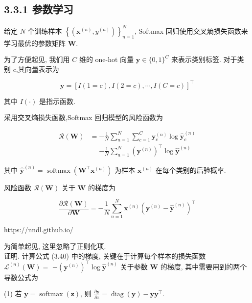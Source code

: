 \documentclass[10pt]{article}
\begin{document}
\subsection*{3.3.1 参数学习}
给定 $N$ 个训练样本 $\left\{\left(\boldsymbol{x}^{(n)}, y^{(n)}\right)\right\}_{n=1}^{N}$, Softmax 回归使用交叉熵损失函数来学习最优的参数矩阵 $\boldsymbol{W}$.

为了方便起见, 我们用 $C$ 维的 one-hot 向量 $\boldsymbol{y} \in\{0,1\}^{C}$ 来表示类别标签. 对于类别 $c$,其向量表示为


\begin{equation*}
\boldsymbol{y}=[I(1=c), I(2=c), \cdots, I(C=c)]^{\top} \tag{3.37}
\end{equation*}


其中 $I(\cdot)$ 是指示函数.

采用交叉熵损失函数,Softmax 回归模型的风险函数为


\begin{align*}
\mathcal{R}(\boldsymbol{W}) & =-\frac{1}{N} \sum_{n=1}^{N} \sum_{c=1}^{C} \boldsymbol{y}_{c}^{(n)} \log \hat{\boldsymbol{y}}_{c}^{(n)}  \tag{3.38}\\
& =-\frac{1}{N} \sum_{n=1}^{N}\left(\boldsymbol{y}^{(n)}\right)^{\top} \log \hat{\boldsymbol{y}}^{(n)} \tag{3.39}
\end{align*}


其中 $\hat{\boldsymbol{y}}^{(n)}=\operatorname{softmax}\left(\boldsymbol{W}^{\top} \boldsymbol{x}^{(n)}\right)$ 为样本 $\boldsymbol{x}^{(n)}$ 在每个类别的后验概率.

风险函数 $\mathcal{R}(\boldsymbol{W})$ 关于 $\boldsymbol{W}$ 的梯度为


\begin{equation*}
\frac{\partial \mathcal{R}(\boldsymbol{W})}{\partial \boldsymbol{W}}=-\frac{1}{N} \sum_{n=1}^{N} \boldsymbol{x}^{(n)}\left(\boldsymbol{y}^{(n)}-\hat{\boldsymbol{y}}^{(n)}\right)^{\top} \tag{3.40}
\end{equation*}


\href{https://nndl.github.io/}{https://nndl.github.io/}

为简单起见, 这里忽略了正则化项.\\
证明. 计算公式 (3.40) 中的梯度, 关键在于计算每个样本的损失函数 $\mathcal{L}^{(n)}(\boldsymbol{W})=$ $-\left(\boldsymbol{y}^{(n)}\right)^{\top} \log \hat{\boldsymbol{y}}^{(n)}$ 关于参数 $\boldsymbol{W}$ 的梯度, 其中需要用到的两个导数公式为

(1) 若 $\boldsymbol{y}=\operatorname{softmax}(\boldsymbol{z})$, 则 $\frac{\partial \boldsymbol{y}}{\partial z}=\operatorname{diag}(\boldsymbol{y})-\boldsymbol{y} \boldsymbol{y}^{\top}$.
\end{document}
